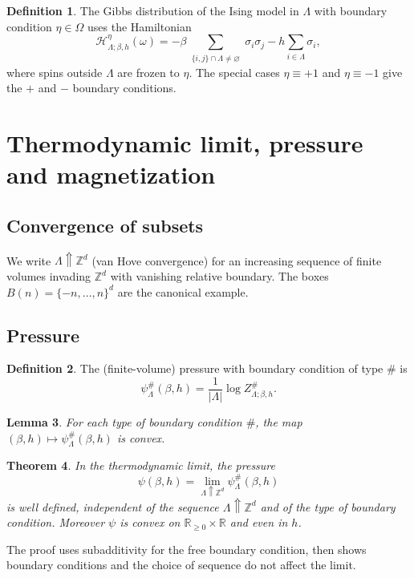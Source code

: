 \documentclass[11pt]{article}
\theoremstyle{plain}
\newtheorem{theorem}{Theorem}
\newtheorem{lemma}[theorem]{Lemma}
\theoremstyle{definition}
\newtheorem{definition}[theorem]{Definition}
\theoremstyle{remark}
\newcommand{\Z}{\mathbb{Z}}
\newcommand{\R}{\mathbb{R}}
\newcommand{\Rgeq}{\R_{\ge 0}}
\newcommand{\incr}{\Uparrow}        %
\newcommand{\La}{\Lambda}
\newcommand{\sg}{\sigma}
\newcommand{\Ham}{\mathcal{H}}
\newcommand{\bdy}{\#}
\begin{document}
\begin{definition}
The Gibbs distribution of the Ising model in $\La$ with boundary condition
$\eta\in\Omega$ uses the Hamiltonian
\[
  \Ham^{\eta}_{\La;\beta,h}(\omega)
    = -\beta \!\!\sum_{\substack{\{i,j\}\cap\La\neq\varnothing}}\!\!
        \sg_i \sg_j - h\sum_{i\in\La}\sg_i,
\]
where spins outside $\La$ are frozen to $\eta$. The special cases $\eta\equiv+1$
and $\eta\equiv-1$ give the $+$ and $-$ boundary conditions.
\end{definition}

\section{Thermodynamic limit, pressure and magnetization}

\subsection{Convergence of subsets}
We write $\La\incr\Z^d$ (van Hove convergence) for an increasing sequence of
finite volumes invading $\Z^d$ with vanishing relative boundary. The boxes
$B(n)=\{-n,\dots,n\}^d$ are the canonical example.

\subsection{Pressure}
\begin{definition}
The (finite-volume) pressure with boundary condition of type $\bdy$ is
\[
  \psi^{\bdy}_\La(\beta,h)
    = \frac{1}{|\La|}\log Z^{\bdy}_{\La;\beta,h}.
\]
\end{definition}

\begin{lemma}
For each type of boundary condition $\bdy$, the map
$(\beta,h)\mapsto\psi^{\bdy}_\La(\beta,h)$ is convex.
\end{lemma}

\begin{theorem}
In the thermodynamic limit, the pressure
\[
  \psi(\beta,h) = \lim_{\La\incr\Z^d} \psi^{\bdy}_\La(\beta,h)
\]
is well defined, independent of the sequence $\La\incr\Z^d$ and of the type of
boundary condition. Moreover $\psi$ is convex on $\Rgeq\times\R$ and even in $h$.
\end{theorem}
\noindent The proof uses subadditivity for the free boundary condition, then
shows boundary conditions and the choice of sequence do not affect the limit.
\end{document}
